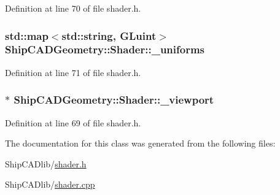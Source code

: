 Definition at line 70 of file shader.\-h.

\hypertarget{classShipCADGeometry_1_1Shader_ab5999f6b8f8542413147444f5144d523}{
\subsubsection[{\-\_\-uniforms}]{\setlength{\rightskip}{0pt plus 5cm}std\-::map$<$std\-::string, G\-Luint$>$ Ship\-C\-A\-D\-Geometry\-::\-Shader\-::\-\_\-uniforms\hspace{0.3cm}{\ttfamily [protected]}}}\label{classShipCADGeometry_1_1Shader_ab5999f6b8f8542413147444f5144d523}


Definition at line 71 of file shader.\-h.

\hypertarget{classShipCADGeometry_1_1Shader_a23ce29f9de114bcfe114028465c58136}{
\subsubsection[{\-\_\-viewport}]{$\ast$ Ship\-C\-A\-D\-Geometry\-::\-Shader\-::\-\_\-viewport\hspace{0.3cm}{\ttfamily [protected]}}}\label{classShipCADGeometry_1_1Shader_a23ce29f9de114bcfe114028465c58136}


Definition at line 69 of file shader.\-h.



The documentation for this class was generated from the following files\-:\begin{DoxyCompactItemize}
\item 
Ship\-C\-A\-Dlib/\hyperlink{shader_8h}{shader.\-h}\item 
Ship\-C\-A\-Dlib/\hyperlink{shader_8cpp}{shader.\-cpp}\end{DoxyCompactItemize}
